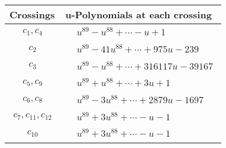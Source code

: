 \documentclass[1p]{elsarticle_modified}
\theoremstyle{definition}
\begin{document}
\begin{tabular}{m{50pt}|m{274pt}}
Crossings & \hspace{64pt}u-Polynomials at each crossing \\
\hline $$\begin{aligned}c_{1},c_{4}\end{aligned}$$&$\begin{aligned}
&u^{89}- u^{88}+\cdots- u+1
\end{aligned}$\\
\hline $$\begin{aligned}c_{2}\end{aligned}$$&$\begin{aligned}
&u^{89}-41 u^{88}+\cdots+975 u-239
\end{aligned}$\\
\hline $$\begin{aligned}c_{3}\end{aligned}$$&$\begin{aligned}
&u^{89}- u^{88}+\cdots+316117 u-39167
\end{aligned}$\\
\hline $$\begin{aligned}c_{5},c_{9}\end{aligned}$$&$\begin{aligned}
&u^{89}+u^{88}+\cdots+3 u+1
\end{aligned}$\\
\hline $$\begin{aligned}c_{6},c_{8}\end{aligned}$$&$\begin{aligned}
&u^{89}-3 u^{88}+\cdots+2879 u-1697
\end{aligned}$\\
\hline $$\begin{aligned}c_{7},c_{11},c_{12}\end{aligned}$$&$\begin{aligned}
&u^{89}+3 u^{88}+\cdots- u-1
\end{aligned}$\\
\hline $$\begin{aligned}c_{10}\end{aligned}$$&$\begin{aligned}
&u^{89}+3 u^{88}+\cdots- u-1
\end{aligned}$\\
\hline
\end{tabular}\\~\\
\newpage\renewcommand{\arraystretch}{1}
\end{document}
